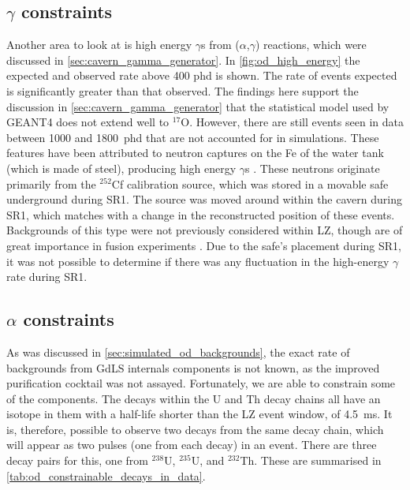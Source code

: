 \subsection{$\gamma$ constraints}
\par
Another area to look at is high energy $\gamma$s from ($\alpha$,$\gamma$) reactions, which were discussed in \autoref{sec:cavern_gamma_generator}.
In \autoref{fig:od_high_energy} the expected and observed rate above 400 phd is shown.
The rate of events expected is significantly greater than that observed.
The findings here support the discussion in \autoref{sec:cavern_gamma_generator} that the statistical model used by GEANT4 does not extend well to ${}^{17}$O.
However, there are still events seen in data between 1000 and 1800~phd that are not accounted for in simulations.
These features have been attributed to neutron captures on the Fe of the water tank (which is made of steel), producing high energy $\gamma$s \cite{iron_neutrons_ref}.
These neutrons originate primarily from the ${}^{252}$Cf calibration source, which was stored in a movable safe underground during SR1.
The source was moved around within the cavern during SR1, which matches with a change in the reconstructed position of these events.
Backgrounds of this type were not previously considered within LZ, though are of great importance in fusion experiments \cite{iter_neutrons_ref}.
Due to the safe's placement during SR1, it was not possible to determine if there was any fluctuation in the high-energy $\gamma$ rate during SR1.



\subsection{$\alpha$ constraints}
\par
As was discussed in \autoref{sec:simulated_od_backgrounds}, the exact rate of backgrounds from GdLS internals components is not known, as the improved purification cocktail was not assayed.
Fortunately, we are able to constrain some of the components. 
The decays within the U and Th decay chains all have an isotope in them with a half-life shorter than the LZ event window, of 4.5~ms.
It is, therefore, possible to observe two decays from the same decay chain, which will appear as two pulses (one from each decay) in an event.
There are three decay pairs for this, one from ${}^{238}$U, ${}^{235}$U, and ${}^{232}$Th.
These are summarised in \autoref{tab:od_constrainable_decays_in_data}.


